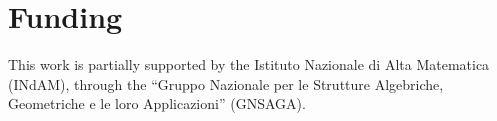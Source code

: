 \documentclass{article}
\newcommand{\pf}[2]{{#1}^{#2}} %
\newcommand{\logic}{\mathsf{S4.2}}
\newcommand{\calculus}{\mathsf{E}_{\logic}}
\newcommand{\agda}{\textsf{Agda}}
\theoremstyle{definition}
\begin{document}

\section*{Funding}
This work is partially supported by the Istituto Nazionale di Alta Matematica (INdAM), through the ``Gruppo Nazionale per le Strutture Algebriche, Geometriche e le loro Applicazioni'' (GNSAGA).

\newpage
\printbibliography

\newpage

\appendix








\end{document}
